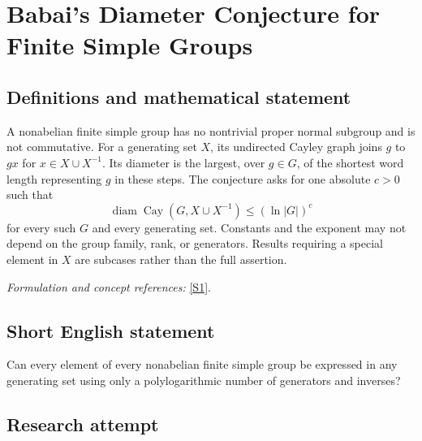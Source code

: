 \documentclass[11pt,a4paper]{article}
\newcommand{\sref}[2]{\hyperlink{source:#1:#2}{[S#2]}}
\newif\ifshowcatalogue
\newcommand{\cataloguescope}[1]{\ifshowcatalogue
 \paragraph{Exact scope in the supplied catalogue.}
 \begin{quote}\small #1\end{quote}\fi}
\numberwithin{equation}{section}
\begin{document}
\setcounter{section}{0}
\clearpage
\section*{\texorpdfstring{Babai's Diameter Conjecture for Finite Simple Groups}{Babai's Diameter Conjecture for Finite Simple Groups}}\label{30000952}
\subsection{Definitions and mathematical statement}
A nonabelian finite simple group has no nontrivial proper normal subgroup and is not commutative. For a generating set $X$, its undirected Cayley graph joins $g$ to $gx$ for $x\in X\cup X^{-1}$. Its diameter is the largest, over $g\in G$, of the shortest word length representing $g$ in these steps. The conjecture asks for one absolute $c>0$ such that
\[
 \operatorname{diam}\operatorname{Cay}(G,X\cup X^{-1})\le(\ln|G|)^c
\]
for every such $G$ and every generating set. Constants and the exponent may not depend on the group family, rank, or generators. Results requiring a special element in $X$ are subcases rather than the full assertion.
\par\smallskip\textit{Formulation and concept references:} \sref{30000952}{1}.
\cataloguescope{Is there an absolute constant c>0 such that for every nonabelian finite simple group G and every generating set X of G, the undirected Cayley graph with steps X union X\textasciicircum{}\{-1\} has diameter at most (ln |G|)\textasciicircum{}c? Thus every element of G is a word of that length in X and its inverses, with the same c for all groups and generating sets.}
\subsection{Short English statement}
Can every element of every nonabelian finite simple group be expressed in any generating set using only a polylogarithmic number of generators and inverses?
\subsection{Research attempt}
\end{document}
